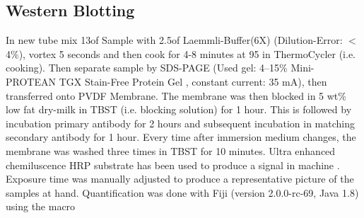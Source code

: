\subsection{Western Blotting}
In new tube mix 13\mul{ }of Sample with 2.5\mul{ }of Laemmli-Buffer(6X) (Dilution-Error: $<$ 4\%), vortex 5 seconds and then cook for 4-8 minutes at 95 \degC in ThermoCycler (i.e. cooking). Then separate sample by SDS-PAGE (Used gel: 4–15\% Mini-PROTEAN TGX Stain-Free Protein Gel , constant current: 35 mA), then transferred onto PVDF Membrane. The membrane was then blocked in 5 wt\% low fat dry-milk in TBST (i.e. blocking solution) for 1 hour. This is followed by incubation primary antibody for 2 hours and subsequent incubation in matching secondary antibody for 1 hour. Every time after immersion medium changes, the membrane was washed three times in TBST for 10 minutes. Ultra enhanced chemiluscence HRP substrate  has been used to produce a signal in machine . Exposure time was manually adjusted to produce a representative picture of the samples at hand. Quantification was done with Fiji (version 2.0.0-rc-69, Java 1.8) using the macro 



